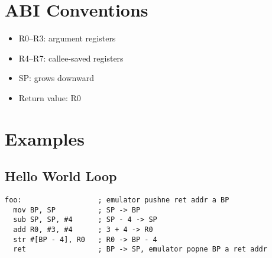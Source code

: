 \documentclass[a4paper,12pt]{article}
\begin{document}
\newpage
\section{ABI Conventions}
\begin{itemize}
  \item R0--R3: argument registers
  \item R4--R7: callee-saved registers
  \item SP: grows downward
  \item Return value: R0
\end{itemize}

\newpage
\section{Examples}
\subsection{Hello World Loop}
\begin{lstlisting}[style=SharkISAStyle]
foo:                  ; emulator pushne ret addr a BP
  mov BP, SP          ; SP -> BP
  sub SP, SP, #4      ; SP - 4 -> SP
  add R0, #3, #4      ; 3 + 4 -> R0
  str #[BP - 4], R0   ; R0 -> BP - 4
  ret                 ; BP -> SP, emulator popne BP a ret addr
\end{lstlisting}
\end{document}
